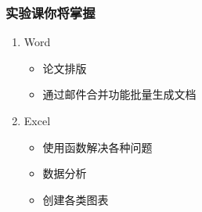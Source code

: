 \begin{frame}
    \frametitle{实验课你将掌握}
    \begin{enumerate}
      \item Word
        \begin{itemize}
          \item 论文排版
          \item 通过邮件合并功能批量生成文档
        \end{itemize}
      \item Excel
        \begin{itemize}
          \item 使用函数解决各种问题
          \item 数据分析
          \item 创建各类图表
        \end{itemize}
    \end{enumerate}
\end{frame}


